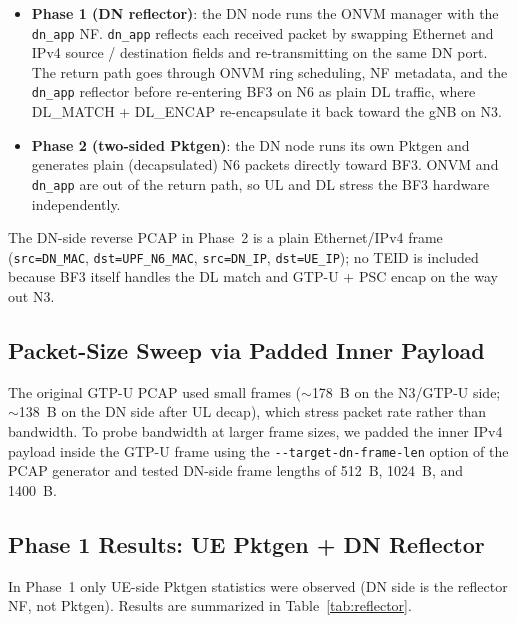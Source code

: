 \documentclass[conference]{IEEEtran}
\newcommand{\code}[1]{\nolinkurl{#1}}
\begin{document}
\begin{itemize}
  \item \textbf{Phase 1 (DN reflector)}: the DN node runs the ONVM
        manager with the \code{dn_app} NF.  \code{dn_app} reflects
        each received packet by swapping Ethernet and IPv4 source /
        destination fields and re-transmitting on the same DN port.
        The return path goes through ONVM ring scheduling, NF
        metadata, and the \code{dn_app} reflector before re-entering
        BF3 on N6 as plain DL traffic, where DL\_MATCH + DL\_ENCAP
        re-encapsulate it back toward the gNB on N3.

  \item \textbf{Phase 2 (two-sided Pktgen)}: the DN node runs its own
        Pktgen and generates plain (decapsulated) N6 packets directly
        toward BF3.  ONVM and \code{dn_app} are out of the return
        path, so UL and DL stress the BF3 hardware independently.
\end{itemize}

The DN-side reverse PCAP in Phase~2 is a plain Ethernet/IPv4 frame
(\code{src=DN_MAC}, \code{dst=UPF_N6_MAC}, \code{src=DN_IP},
\code{dst=UE_IP}); no TEID is included because BF3 itself handles the
DL match and GTP-U + PSC encap on the way out N3.

\subsection{Packet-Size Sweep via Padded Inner Payload}

The original GTP-U PCAP used small frames ($\sim$178~B on the
N3/GTP-U side; $\sim$138~B on the DN side after UL decap), which
stress packet rate rather than bandwidth.  To probe bandwidth at
larger frame sizes, we padded the inner IPv4 payload inside the
GTP-U frame using the \code{--target-dn-frame-len} option of the
PCAP generator and tested DN-side frame lengths of 512~B, 1024~B, and
1400~B.

\subsection{Phase 1 Results: UE Pktgen + DN Reflector}

In Phase~1 only UE-side Pktgen statistics were observed (DN side is
the reflector NF, not Pktgen).  Results are summarized in
Table~\ref{tab:reflector}.
\end{document}
